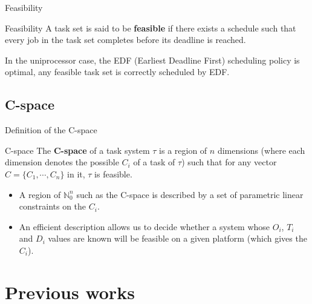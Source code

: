 \documentclass{beamer}
\begin{document}
	\begin{frame}{Feasibility}
		\begin{block}{Feasibility}
        A task set is said to be \textbf{feasible} if there exists a schedule such that every job in the task set completes before its deadline is reached.
        \end{block}


        In the uniprocessor case, the EDF (Earliest Deadline First) scheduling policy is optimal, any feasible task set is correctly scheduled by EDF.
	\end{frame}

    \subsection{C-space}

    \begin{frame}{Definition of the C-space}
        \begin{block}{C-space}
            The \textbf{C-space} of a task system $\tau$ is a region of $n$ dimensions (where each dimension denotes the possible $C_i$ of a task of $\tau$) such that for any vector $C = \{ C_1, \cdots, C_{n}\}$ in it, $\tau$ is feasible.
        \end{block}

        \begin{itemize}
            \item A region of $\mathbb{N}_0^n$ such as the C-space is described by a set of parametric linear constraints on the $C_i$.
            \item An efficient description allows us to decide whether a system whose $O_i$, $T_i$ and $D_i$ values are known will be feasible on a given platform (which gives the $C_i$).
        \end{itemize}

    \end{frame}

	\section{Previous works}
\end{document}
